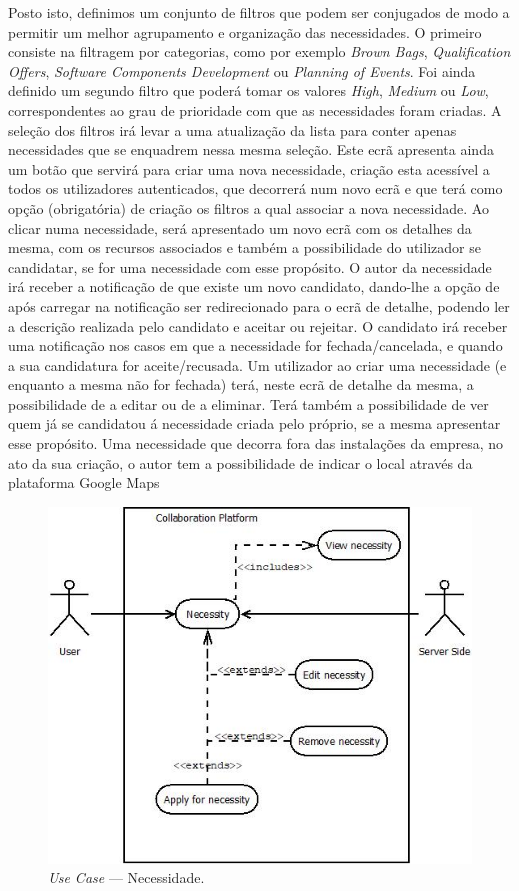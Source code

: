 Posto isto, definimos um conjunto de filtros que podem ser conjugados de modo a permitir um melhor agrupamento e organização das necessidades. O primeiro consiste na filtragem por categorias, como por exemplo \textit{Brown Bags}, 
\textit{Qualification Offers}, \textit{Software Components Development} ou \textit{Planning of Events}. 
Foi ainda definido um segundo filtro que poderá tomar os valores \textit{High}, \textit{Medium} ou \textit{Low}, 
correspondentes ao grau de prioridade com que as necessidades foram criadas. 
A seleção dos filtros irá levar a uma atualização da lista para conter apenas necessidades que se enquadrem nessa mesma seleção. 
Este ecrã apresenta ainda um botão que servirá para criar uma nova necessidade, criação esta acessível a todos os utilizadores autenticados, 
que decorrerá num novo ecrã e que terá como opção (obrigatória) de criação os filtros a qual associar a nova necessidade. 
Ao clicar numa necessidade, será apresentado um novo ecrã com os detalhes da mesma, com os recursos associados e também a possibilidade do utilizador se candidatar, 
se for uma necessidade com esse propósito. O autor da necessidade irá receber a notificação de que existe um novo candidato, 
dando-lhe a opção de após carregar na notificação ser redirecionado para o ecrã de detalhe, podendo ler a descrição realizada pelo candidato e aceitar ou rejeitar. 
O candidato irá receber uma notificação nos casos em que a necessidade for fechada/cancelada, e quando a sua candidatura for aceite/recusada. 
Um utilizador ao criar uma necessidade (e enquanto a mesma não for fechada) terá, neste ecrã de detalhe da mesma, a possibilidade de a editar ou de a eliminar. 
Terá também a possibilidade de ver quem já se candidatou á necessidade criada pelo próprio, se a mesma apresentar esse propósito. 
Uma necessidade que decorra fora das instalações da empresa, no ato da sua criação, o autor tem a possibilidade de indicar o local através da plataforma Google Maps

\begin{figure}[H]
    \centering
    \includegraphics[scale=0.6]{figures/Necessity.jpeg}
    \caption{\textit{Use Case} --- Necessidade.}\label{fig:uc:necessity}
\end{figure}

